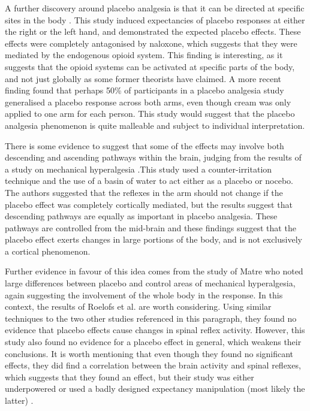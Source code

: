 A further discovery around placebo analgesia is that it can be directed at specific sites in the body \cite{Benedetti1999} . This study induced expectancies of placebo responses at either the right or the left hand, and demonstrated the expected placebo effects. These effects were completely antagonised by naloxone, which suggests that they were mediated by the endogenous opioid system. This finding is interesting, as it suggests that the opioid systems can be activated at specific parts of the body, and not just globally as some former theorists have claimed. A more recent finding \cite{Watson2006} found that perhaps 50\% of participants in a placebo analgesia study generalised a placebo response across both arms, even though cream was only applied to one arm for each person. This study would suggest that the placebo analgesia phenomenon is quite malleable and subject to individual interpretation. 

There is some evidence to suggest that some of the effects may involve both descending and ascending pathways within the brain, judging from the results of a study on mechanical hyperalgesia \cite{Goffaux2007}.This study used a counter-irritation technique and the use of a basin of water to act either as a placebo or nocebo. The authors suggested that the reflexes in the arm should not change if the placebo effect was completely cortically mediated, but the results suggest that descending pathways are equally as important in placebo analgesia. These pathways are controlled from the mid-brain and these findings suggest that the placebo effect exerts changes in large portions of the body, and is not exclusively a cortical phenomenon. 

Further evidence in favour of this idea comes from the study of Matre \cite{Matre2006a} who noted large differences between placebo and control areas of mechanical hyperalgesia, again suggesting the involvement of the whole body in the response. In this context, the results of Roelofs et al. \cite{Roelofs2000} are worth considering. Using similar techniques to the two other studies referenced in this paragraph, they found no evidence that placebo effects cause changes in spinal reflex activity. However, this study also found no evidence for a placebo effect in general, which weakens their conclusions. It is worth mentioning that even though they found no significant effects, they did find a correlation between the brain activity and spinal reflexes, which suggests that they found an effect, but their study was either underpowered or used a badly designed expectancy manipulation (most likely the latter) \cite{Goffaux2007}.

